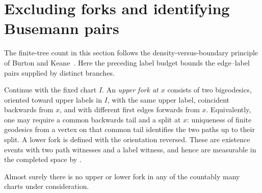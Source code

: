 \section{Excluding forks and identifying Busemann pairs}\label{sec:forks}

The finite-tree count in this section follows the density-versus-boundary
principle of Burton and Keane~\cite{BurtonKeane1989}. Here the preceding
label budget bounds the edge--label pairs supplied by distinct branches.

Continue with the fixed chart $I$.  An \emph{upper fork at $x$} consists
of two bigeodesics, oriented toward upper labels in $I$, with the same
upper label, coincident backwards from $x$, and with different first
edges forwards from $x$.  Equivalently, one may require a common
backwards tail and a split at $x$: uniqueness of finite geodesics from a
vertex on that common tail identifies the two paths up to their split.
A lower fork is defined with the orientation reversed.  These are
existence events with two path witnesses and a label witness, and hence
are measurable in the completed space by .

\begin{proposition}\label{prop:no-forks}
Almost surely there is no upper or lower fork in any of the countably
many charts under consideration.
\end{proposition}

